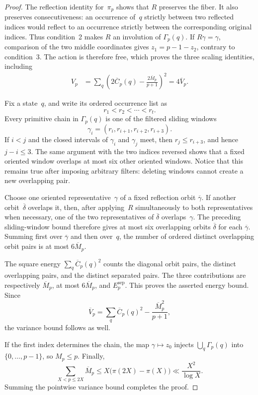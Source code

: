 \begin{proof}
The reflection identity for~$\pi_p$ shows that $R$ preserves the fiber.
It also preserves consecutiveness: an occurrence of~$q$ strictly between
two reflected indices would reflect to an occurrence strictly between the
corresponding original indices.  Thus condition~2 makes $R$ an involution
of $\Gamma_p(q)$.  If $R\gamma=\gamma$, comparison of the two middle
coordinates gives $z_1=p-1-z_2$, contrary to condition~3.  The action is
therefore free, which proves the three scaling identities, including
\[
 \begin{split}
 V_p
 &=\sum_q\left(2\overline C_p(q)
       -\frac{2\overline M_p}{p+1}\right)^2
 =4\overline V_p.
 \end{split}
\]

Fix a state~$q$, and write its ordered occurrence list as
\[
 r_1<r_2<\cdots<r_t.
\]
Every primitive chain in $\Gamma_p(q)$ is one of the filtered sliding
windows
\[
 \gamma_i=(r_i,r_{i+1},r_{i+2},r_{i+3}).
\]
If $i<j$ and the closed intervals of $\gamma_i$ and $\gamma_j$ meet,
then $r_j\le r_{i+3}$, and hence $j-i\le3$.  The same argument with the
two indices reversed shows that a fixed oriented window overlaps at most
six other oriented windows.  Notice that this remains true after imposing
arbitrary filters: deleting windows cannot create a new overlapping pair.

Choose one oriented representative~$\gamma$ of a fixed reflection orbit
$\overline\gamma$.  If another orbit~$\overline\delta$ overlaps it, then,
after applying~$R$ simultaneously to both representatives when necessary,
one of the two representatives of $\overline\delta$ overlaps~$\gamma$.
The preceding sliding-window bound therefore gives at most six overlapping
orbits $\overline\delta$ for each $\overline\gamma$.  Summing first over
$\overline\gamma$ and then over~$q$, the number of ordered distinct
overlapping orbit pairs is at most $6\overline M_p$.

The square energy $\sum_q\overline C_p(q)^2$ counts the diagonal orbit
pairs, the distinct overlapping pairs, and the distinct separated pairs.
The three contributions are respectively $\overline M_p$, at most
$6\overline M_p$, and $E_p^{\mathrm{sep}}$.  This proves the asserted
energy bound.  Since
\[
 \overline V_p
 =\sum_q\overline C_p(q)^2
  -\frac{\overline M_p^2}{p+1},
\]
the variance bound follows as well.

If the first index determines the chain, the map
$\gamma\mapsto z_0$ injects $\bigcup_q\Gamma_p(q)$ into
$\{0,\ldots,p-1\}$, so $M_p\le p$.  Finally,
\[
 \sum_{X<p\le2X}\overline M_p
 \le X\bigl(\pi(2X)-\pi(X)\bigr)
 \ll\frac{X^2}{\log X}.
\]
Summing the pointwise variance bound completes the proof.
\end{proof}

